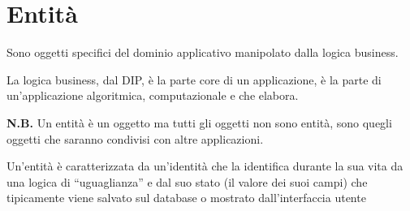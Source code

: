 \chapter{Entità}

Sono oggetti specifici del dominio applicativo manipolato dalla logica business.

La logica business, dal DIP, è la parte core di un applicazione, è la parte di un’applicazione algoritmica, computazionale e che elabora.
\medskip

\textbf{N.B.} Un entità è un oggetto ma tutti gli oggetti non sono entità, sono quegli oggetti che saranno condivisi con altre applicazioni.
\medskip

Un’entità è caratterizzata da un’identità che la identifica durante la sua vita da una logica di “uguaglianza” e dal suo stato (il valore dei suoi campi) che 
tipicamente viene salvato sul database o  mostrato dall’interfaccia utente